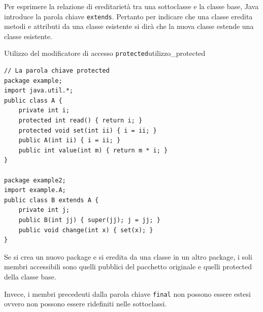 \documentclass[12pt]{report}
\newcommand{\nmu}{}
\begin{document}
Per esprimere la relazione di ereditarietà tra una sottoclasse e la classe base, Java introduce la parola chiave \texttt{extends}. Pertanto per indicare che una classe eredita metodi e attributi da una classe esistente si dirà che la nuova classe estende una classe esistente.
\begin{example}{\nmu Utilizzo del modificatore di accesso \texttt{protected}}{utilizzo_protected}
\begin{lstlisting}[style=javastyle]
// La parola chiave protected
package example;
import java.util.*;
public class A {
	private int i;
	protected int read() { return i; }
	protected void set(int ii) { i = ii; }
	public A(int ii) { i = ii; }
	public int value(int m) { return m * i; }
}

package example2;
import example.A;
public class B extends A {
	private int j;
	public B(int jj) { super(jj); j = jj; }
	public void change(int x) { set(x); }
}
\end{lstlisting}
\end{example}
Se si crea un nuovo package e si eredita da una classe in un altro package, i soli membri accessibili sono quelli pubblici del pacchetto originale e quelli protected della classe base.

Invece, i membri precedeuti dalla parola chiave \texttt{final} non possono essere estesi ovvero non possono essere ridefiniti nelle sottoclassi.
\end{document}
